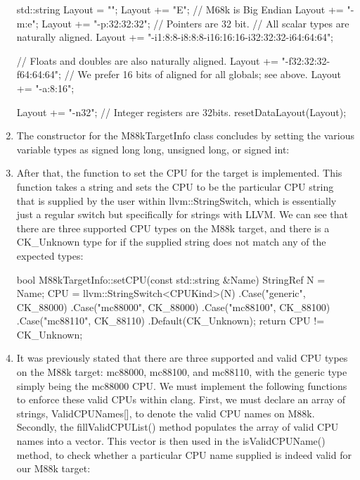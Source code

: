 \begin{enumerate}
\begin{cpp}
    std::string Layout = "";
    Layout += "E"; // M68k is Big Endian
    Layout += "-m:e";
    Layout += "-p:32:32:32"; // Pointers are 32 bit.
    // All scalar types are naturally aligned.
    Layout += "-i1:8:8-i8:8:8-i16:16:16-i32:32:32-i64:64:64";

    // Floats and doubles are also naturally aligned.
    Layout += "-f32:32:32-f64:64:64";
    // We prefer 16 bits of aligned for all globals; see above.
    Layout += "-a:8:16";

    Layout += "-n32"; // Integer registers are 32bits.
    resetDataLayout(Layout);
\end{cpp}

\item
The constructor for the M88kTargetInfo class concludes by setting the various variable types as signed long long, unsigned long, or signed int:

\begin{cpp}
    IntMaxType = SignedLongLong;
    Int64Type = SignedLongLong;
    SizeType = UnsignedLong;
    PtrDiffType = SignedInt;
    IntPtrType = SignedInt;
}
\end{cpp}

\item
After that, the function to set the CPU for the target is implemented. This function takes a string and sets the CPU to be the particular CPU string that is supplied by the user within llvm::StringSwitch, which is essentially just a regular switch but specifically for strings with LLVM. We can see that there are three supported CPU types on the M88k target, and there is a CK\_Unknown type for if the supplied string does not match any of the expected types:

\begin{cpp}
bool M88kTargetInfo::setCPU(const std::string &Name) {
    StringRef N = Name;
    CPU = llvm::StringSwitch<CPUKind>(N)
                .Case("generic", CK_88000)
                .Case("mc88000", CK_88000)
                .Case("mc88100", CK_88100)
                .Case("mc88110", CK_88110)
                .Default(CK_Unknown);
    return CPU != CK_Unknown;
}
\end{cpp}

\item
It was previously stated that there are three supported and valid CPU types on the M88k target: mc88000, mc88100, and mc88110, with the generic type simply being the mc88000 CPU. We must implement the following functions to enforce these valid CPUs within clang. First, we must declare an array of strings, ValidCPUNames[], to denote the valid CPU names on M88k. Secondly, the fillValidCPUList() method populates the array of valid CPU names into a vector. This vector is then used in the isValidCPUName() method, to check whether a particular CPU name supplied is indeed valid for our M88k target:


\end{enumerate}
